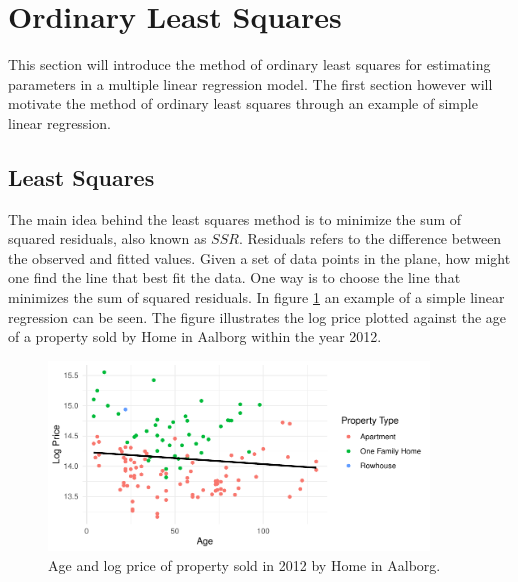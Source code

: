 \section{Ordinary Least Squares}
This section will introduce the method of ordinary least squares for estimating parameters in a multiple linear regression model.
The first section however will motivate the method of ordinary least squares through an example of simple linear regression.

\subsection{Least Squares}
The main idea behind the least squares method is to minimize the sum of squared residuals, also known as $SSR$.
Residuals refers to the difference between the observed and fitted values.
Given a set of data points in the plane, how might one find the line that best fit the data. 
One way is to choose the line that minimizes the sum of squared residuals.
In figure \ref{fig:example_simple_linear_regression} an example of a simple linear regression can be seen. 
The figure illustrates the log price plotted against the age of a property sold by Home in Aalborg within the year 2012.

\begin{figure}[h]
    \centering
    \includegraphics[width = 0.9\textwidth]{figures/Ordinary_Least_Squares/example_linear_regression.pdf}
    \caption{Age and log price of property sold in 2012 by Home in Aalborg.}
    \label{fig:example_simple_linear_regression}
\end{figure}

